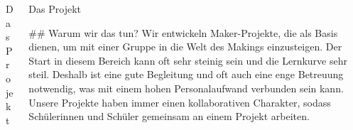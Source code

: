 \documentclass{beamer}%
\begin{document}
\begin{columns}[T]
\begin{column}{.32\textwidth}
\begin{block}{Das Projekt}
\begin{markdown}
\end{markdown}%
\end{block}%
\end{column}%
\begin{column}{.32\textwidth}%
\begin{block}{Das Projekt}%
\begin{markdown}
## Warum wir das tun?
Wir entwickeln Maker-Projekte, die als Basis dienen, um mit einer Gruppe in die Welt des Makings einzusteigen. Der Start in diesem Bereich kann oft sehr steinig sein und die Lernkurve sehr steil. Deshalb ist eine gute Begleitung und oft auch eine enge Betreuung notwendig, was mit einem hohen Personalaufwand verbunden sein kann. Unsere Projekte haben immer einen kollaborativen Charakter, sodass Schülerinnen und Schüler gemeinsam an einem Projekt arbeiten.
\end{markdown}%
\end{block}%
\end{column}%
\end{columns}%
\end{document}
